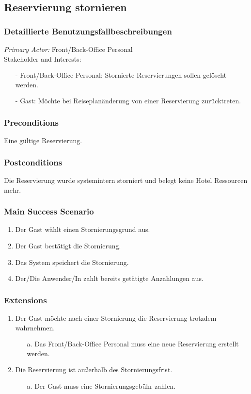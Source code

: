 \documentclass[./detailed_overview_usecases.tex]{subfiles}
\begin{document}
    \subsection{Reservierung stornieren}
    \subsubsection{Detaillierte Benutzungsfallbeschreibungen}
    \textit{Primary Actor:}
    Front/Back-Office Personal
    \\
    Stakeholder and Interests:
    \begin{itemize}
        \item[-] Front/Back-Office Personal: Stornierte Reservierungen sollen gelöscht werden.
        \item[-] Gast: Möchte bei Reiseplanänderung von einer Reservierung zurücktreten.
    \end{itemize}

    \subsubsection*{Preconditions}
    Eine gültige Reservierung.

    \subsubsection*{Postconditions}
    Die Reservierung wurde systemintern storniert und belegt keine Hotel Ressourcen mehr.

    \subsubsection*{Main Success Scenario}
    \begin{enumerate}
        \item Der Gast wählt einen Stornierungsgrund aus.
        \item Der Gast bestätigt die Stornierung.
        \item Das System speichert die Stornierung.
        \item Der/Die Anwender/In zahlt bereits getätigte Anzahlungen aus.
    \end{enumerate}

    \subsubsection*{Extensions}
    \begin{enumerate}
        \item Der Gast möchte nach einer Stornierung die Reservierung trotzdem wahrnehmen.
        \begin{itemize}
            \item[a.] Das Front/Back-Office Personal muss eine neue Reservierung erstellt werden.
        \end{itemize}
        \item Die Reservierung ist außerhalb des Stornierungsfrist.
        \begin{itemize}
            \item[a.] Der Gast muss eine Stornierungsgebühr zahlen.
        \end{itemize}
    \end{enumerate}
\end{document}
